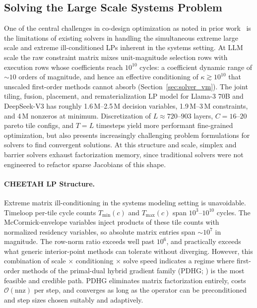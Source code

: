 \subsection{Solving the Large Scale Systems Problem}
\label{app:custom_solve}
One of the central challenges in co-design optimization as noted in prior work~\citep{zhang_fast} is the limitations of existing solvers in handling the simultaneous extreme large scale and extreme ill-conditioned LPs inherent in the systems setting. At LLM scale the raw constraint matrix mixes unit-magnitude selection rows with execution rows whose coefficients reach $10^{10}$ cycles: a coefficient dynamic range of ${\sim}10$ orders of magnitude, and hence an effective conditioning of $\kappa \gtrsim 10^{10}$ that unscaled first-order methods cannot absorb (Section~\ref{sec:solver_vm}).
The joint tiling, fusion, placement, and rematerialization LP model for Llama-3 70B and DeepSeek-V3 has roughly 1.6\,M--2.5\,M decision variables, 1.9\,M--3\,M
constraints, and 4\,M nonzeros at minimum. Discretization of $L \approx 720$--$903$ layers, $C = 16$--$20$ pareto tile configs,
and $T = L$ timesteps yield more performant fine-grained optimization, but also presents increasingly challenging problem formulations for solvers to find convergent solutions. 
At this structure and scale, simplex and barrier solvers exhaust factorization memory, since traditional solvers were not engineered to refactor sparse Jacobians of this shape.

\paragraph{CHEETAH LP Structure.} Extreme matrix ill-conditioning in the systems modeling setting is unavoidable. Timeloop per-tile cycle counts $T_{\min}(c)$ and $T_{\max}(c)$ span $10^3$--$10^{10}$ cycles.
The McCormick-envelope variables inject products of these
tile counts with normalized residency variables, so absolute matrix
entries span ${\sim}10^7$ in magnitude. The row-norm ratio exceeds well past $10^6$, and practically exceeds what generic interior-point methods can tolerate without diverging. 
However, this combination of scale $\times$ conditioning $\times$ solve speed
indicates a regime where first-order methods of the 
primal-dual hybrid gradient family (PDHG; \cite{chambolle2011first}) is the most feasible and credible path.
PDHG eliminates matrix factorization entirely, costs $\mathcal{O}(\text{nnz})$
per step, and converges as long as the operator can be preconditioned and
step sizes chosen suitably and adaptively. 

